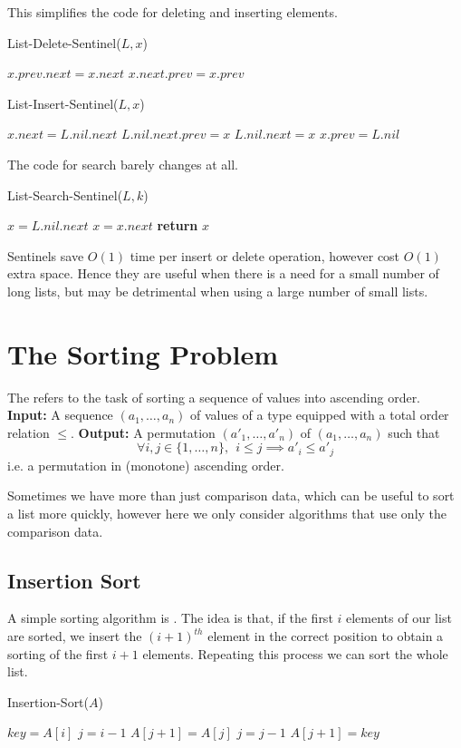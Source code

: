 \documentclass[11pt]{report}
\begin{document}
This simplifies the code for deleting and inserting elements.
\mypar
\begin{algorithm}
    [H]
    \caption{List-Delete-Sentinel($L,x$)}
    $x.prev.next = x.next$\;
    $x.next.prev = x.prev$\;
\end{algorithm}
\mypar
\begin{algorithm}
    [H]
    \caption{List-Insert-Sentinel($L,x$)}
    $x.next = L.nil.next$\;
    $L.nil.next.prev = x$\;
    $L.nil.next = x$\;
    $x.prev = L.nil$\;
\end{algorithm} 
\mypar
The code for search barely changes at all.
\mypar
\begin{algorithm}
    [H]
    \caption{List-Search-Sentinel($L,k$)}
    $x = L.nil.next$\;
    {$x = x.next$\;}
    \textbf{return }$x$\;
\end{algorithm}
\mypar
Sentinels save $O(1)$ time per insert or delete operation, however cost $O(1)$ extra space. Hence they are useful when there is a need for a small number of long lists, but may be detrimental when using a large number of small lists.
\pagebreak
\section{The Sorting Problem}
\begin{nproblem}
    The  refers to the task of sorting a sequence of values into ascending order.
    \mypar \textbf{Input:} A sequence $(a_1, \dots, a_n)$ of values of a type equipped with a total order relation $\leq$.
    \mypar \textbf{Output:} A permutation $(a'_1, \dots, a'_n)$ of $(a_1, \dots, a_n)$ such that 
    \[\forall i,j \in \{1,\dots,n \}, \ \  i \leq j \implies a'_i \leq a'_j  \]
    i.e. a permutation in (monotone) ascending order.
\end{nproblem}
\begin{sidenote}
    Sometimes we have more than just comparison data, which can be useful to sort a list more quickly, however here we only consider algorithms that use only the comparison data.
\end{sidenote}
\subsection{Insertion Sort}
A simple sorting algorithm is . The idea is that, if the first $i$ elements of our list are sorted, we insert the $(i+1)^{th}$ element in the correct position to obtain a sorting of the first $i+1$ elements. Repeating this process we can sort the whole list.  
\begin{algorithm}
    \caption{Insertion-Sort($A$)}
    {
        $key = A[i]$\;
        $j = i - 1$\;
        {
            $A[j+1] = A[j]$\;
            $j = j - 1$\;
        }
        $A[j+1] = key$\;    
    }
\end{algorithm}
\printindex
\end{document}
